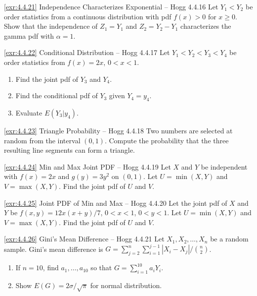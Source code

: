 \begin{exercise}{\ref{exr:4.4.21} Independence Characterizes Exponential – Hogg 4.4.16}\label{exr:4.4.21}
Let $Y_1 < Y_2$ be order statistics from a continuous distribution with pdf $f(x)>0$ for $x \geq 0$. Show that the independence of $Z_1=Y_1$ and $Z_2=Y_2-Y_1$ characterizes the gamma pdf with $\alpha=1$.
\end{exercise}

\begin{exercise}{\ref{exr:4.4.22} Conditional Distribution – Hogg 4.4.17}\label{exr:4.4.22}
Let $Y_1 < Y_2 < Y_3 < Y_4$ be order statistics from $f(x)=2x$, $0<x<1$.
\begin{enumerate}
\item[(a)] Find the joint pdf of $Y_3$ and $Y_4$.
\item[(b)] Find the conditional pdf of $Y_3$ given $Y_4=y_4$.
\item[(c)] Evaluate $E(Y_3|y_4)$.
\end{enumerate}
\end{exercise}

\begin{exercise}{\ref{exr:4.4.23} Triangle Probability – Hogg 4.4.18}\label{exr:4.4.23}
Two numbers are selected at random from the interval $(0,1)$. Compute the probability that the three resulting line segments can form a triangle.
\end{exercise}

\begin{exercise}{\ref{exr:4.4.24} Min and Max Joint PDF – Hogg 4.4.19}\label{exr:4.4.24}
Let $X$ and $Y$ be independent with $f(x)=2x$ and $g(y)=3y^2$ on $(0,1)$. Let $U=\min(X,Y)$ and $V=\max(X,Y)$. Find the joint pdf of $U$ and $V$.
\end{exercise}

\begin{exercise}{\ref{exr:4.4.25} Joint PDF of Min and Max – Hogg 4.4.20}\label{exr:4.4.25}
Let the joint pdf of $X$ and $Y$ be $f(x,y)=12x(x+y)/7$, $0<x<1$, $0<y<1$. Let $U=\min(X,Y)$ and $V=\max(X,Y)$. Find the joint pdf of $U$ and $V$.
\end{exercise}

\begin{exercise}{\ref{exr:4.4.26} Gini's Mean Difference – Hogg 4.4.21}\label{exr:4.4.26}
Let $X_1, X_2, \ldots, X_n$ be a random sample. Gini's mean difference is $G = \sum_{j=2}^n \sum_{i=1}^{j-1} |X_i-X_j| / \binom{n}{2}$.
\begin{enumerate}
\item[(a)] If $n=10$, find $a_1, \ldots, a_{10}$ so that $G = \sum_{i=1}^{10} a_i Y_i$.
\item[(b)] Show $E(G) = 2\sigma/\sqrt{\pi}$ for normal distribution.
\end{enumerate}
\end{exercise}

